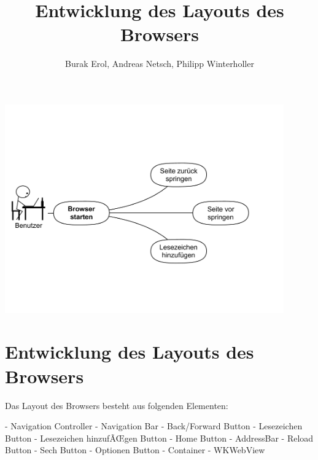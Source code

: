
\title{Entwicklung des Layouts des Browsers}
\author{Burak Erol, Andreas Netsch, Philipp Winterholler}

\includegraphics[width=12cm]{Pics/use_case_browser}

\section{Entwicklung des Layouts des Browsers}

Das Layout des Browsers besteht aus folgenden Elementen:

- Navigation Controller
- Navigation Bar
	- Back/Forward Button
	- Lesezeichen Button
	- Lesezeichen hinzufÃŒgen Button
	- Home Button
	- AddressBar
	- Reload Button
	- Sech Button
	- Optionen Button
- Container
- WKWebView

